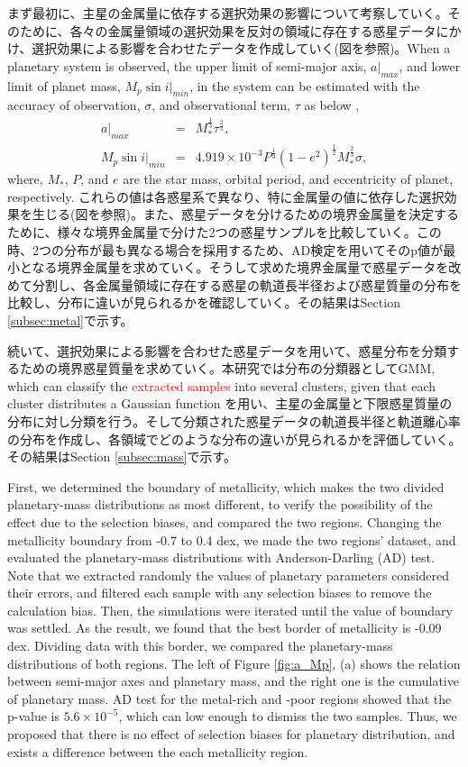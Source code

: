 \documentclass[twocolumn, dvipdfmx]{aastex62}
\def\red<#1>{\textcolor{red}{#1}}
\begin{document}
\begin{CJK*}{UTF8}{min}
まず最初に、主星の金属量に依存する選択効果の影響について考察していく。そのために、各々の金属量領域の選択効果を反対の領域に存在する惑星データにかけ、選択効果による影響を合わせたデータを作成していく(図を参照)。When a planetary system is observed, the upper limit of semi-major axis, $a|_{max}$, and lower limit of planet mass, $M_p\sin i|_{min}$, in the system can be estimated with the accuracy of observation, $\sigma$, and observational term, $\tau$ as below \citep{2008ApJ...677.1324T},
\begin{eqnarray}
a|_{max} &=& M_{*}^{\frac{1}{3}}\tau^{\frac{2}{3}} , \\
M_p\sin i|_{min} &=& 4.919\times10^{-3}P^{\frac{1}{3}}(1-e^2)^{\frac{1}{2}}M_{*}^{\frac{2}{3}}\sigma ,
\end{eqnarray}
where, $M_*$, $P$, and $e$ are the star mass, orbital period, and eccentricity of planet, respectively. これらの値は各惑星系で異なり、特に金属量の値に依存した選択効果を生じる(図を参照)。また、惑星データを分けるための境界金属量を決定するために、様々な境界金属量で分けた2つの惑星サンプルを比較していく。この時、2つの分布が最も異なる場合を採用するため、AD検定を用いてそのp値が最小となる境界金属量を求めていく。そうして求めた境界金属量で惑星データを改めて分割し、各金属量領域に存在する惑星の軌道長半径および惑星質量の分布を比較し、分布に違いが見られるかを確認していく。その結果はSection \ref{subsec:metal}で示す。

続いて、選択効果による影響を合わせた惑星データを用いて、惑星分布を分類するための境界惑星質量を求めていく。本研究では分布の分類器としてGMM, which can classify the \red<extracted samples> into several clusters, given that each cluster distributes a Gaussian function \citep[e.g.,][]{2012MNRAS.424.2832L, 2017A&A...603A..30S, 2018ApJ...853...37S}を用い、主星の金属量と下限惑星質量の分布に対し分類を行う。そして分類された惑星データの軌道長半径と軌道離心率の分布を作成し、各領域でどのような分布の違いが見られるかを評価していく。その結果はSection \ref{subsec:mass}で示す。

First, we determined the boundary of metallicity, which makes the two divided planetary-mass distributions as most different, to verify the possibility of the effect due to the selection biases, and compared the two regions. Changing the metallicity boundary from -0.7 to 0.4 dex, we made the two regions' dataset, and evaluated the planetary-mass distributions with Anderson-Darling (AD) test. Note that we extracted randomly the values of planetary parameters considered their errors, and filtered each sample with any selection biases to remove the calculation bias. Then, the simulations were iterated until the value of boundary was settled. As the result, we found that the best border of metallicity is -0.09 dex. Dividing data with this border, we compared the planetary-mass distributions of both regions. The left of Figure \ref{fig:a_Mp}, (a) shows the relation between semi-major axes and planetary mass, and the right one is the cumulative of planetary mass. AD test for the metal-rich and -poor regions showed that the p-value is $5.6\times10^{-5}$, which can low enough to dismiss the two samples. Thus, we proposed that there is no effect of selection biases for planetary distribution, and exists a difference between the each metallicity region.


\end{CJK*}
\end{document}
